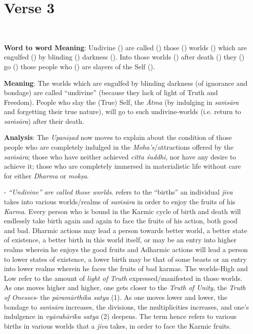 \chapter{Verse 3}

\begin{moolashloka}
\\
\end{moolashloka}

\textbf{Word to word Meaning}: Undivine () are called () those () worlds () which are engulfed () by blinding () darkness (). Into those worlds () after death () they () go () those people who () are slayers of the Self ().

\textbf{Meaning}: The worlds which are engulfed by blinding darkness (of ignorance and bondage) are called ``undivine'' (because they lack of light of Truth and Freedom). People who slay the (True) Self, the \emph{Ātma} (by indulging in \emph{saṁsāra} and forgetting their true nature), will go to such undivine-worlds (i.e. return to \emph{saṁsāra}) after their death.

\textbf{Analysis}: The \emph{Upaniṣad} now moves to explain about the condition of those people who are completely indulged in the \emph{Moha's}/attractions offered by the \emph{saṁsāra}; those who have neither achieved \emph{citta śuddhi}, nor have any desire to achieve it; those who are completely immersed in materialistic life without care for either \emph{Dharma} or \emph{mokṣa}.

- \emph{``Undivine'' are called those worlds}.  refers to the ``births'' an individual \emph{jīva} takes into various worlds/realms of \emph{saṁsāra} in order to enjoy the fruits of his \emph{Karma}. Every person who is bound in the Karmic cycle of birth and death will endlessly take birth again and again to face the fruits of his action, both good and bad. Dharmic actions may lead a person towards better world, a better state of existence, a better birth in this world itself, or may be an entry into higher realms wherein he enjoys the good fruits and Adharmic actions will lead a person to lower states of existence, a lower birth may be that of some beasts or an entry into lower realms wherein he faces the fruits of bad karmas. The worlds-High and Low refer to the amount of \emph{light of Truth} expressed/manifested in those worlds. As one moves higher and higher, one gets closer to the \emph{Truth of Unity}, the \emph{Truth of Onesses}- the \emph{pāramārthika satya} (1). As one moves lower and lower, the bondage to \emph{saṁsāra} increases, the divisions, the multiplicities increases, and one's indulgence in \emph{vyāvahārika satya} (2) deepens. The term  hence refers to various births in various worlds that a \emph{jīva} takes, in order to face the Karmic fruits.

